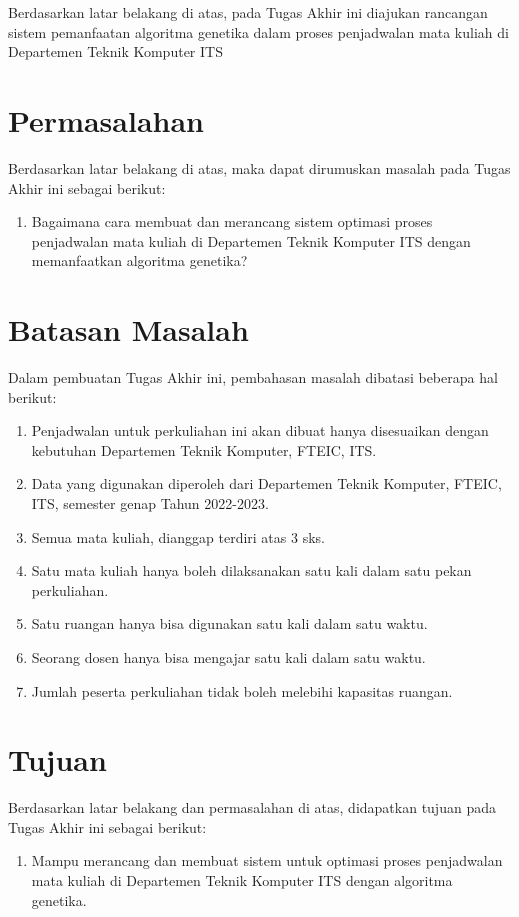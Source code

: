 Berdasarkan latar belakang di atas, pada Tugas Akhir ini diajukan rancangan sistem pemanfaatan algoritma genetika dalam proses penjadwalan mata kuliah di Departemen Teknik Komputer ITS
\section{Permasalahan}
\label{sec:permasalahan}

Berdasarkan latar belakang di atas, maka dapat dirumuskan masalah pada Tugas Akhir ini sebagai berikut:
\begin{enumerate}
    \item Bagaimana cara membuat dan merancang sistem optimasi proses penjadwalan mata kuliah di Departemen Teknik Komputer ITS dengan memanfaatkan algoritma genetika?
\end{enumerate}
\section{Batasan Masalah}
\label{sec:batasanmasalah}

Dalam pembuatan Tugas Akhir ini, pembahasan masalah dibatasi beberapa hal berikut:
\begin{enumerate}
    \item Penjadwalan untuk perkuliahan ini akan dibuat hanya disesuaikan dengan kebutuhan Departemen Teknik Komputer, FTEIC, ITS.
    \item Data yang digunakan diperoleh dari Departemen Teknik Komputer, FTEIC, ITS, semester genap Tahun 2022-2023.
    \item Semua mata kuliah, dianggap terdiri atas 3 sks.
    \item Satu mata kuliah hanya boleh dilaksanakan satu kali dalam satu pekan perkuliahan.
    \item Satu ruangan hanya bisa digunakan satu kali dalam satu waktu.
    \item Seorang dosen hanya bisa mengajar satu kali dalam satu waktu.
    \item Jumlah peserta perkuliahan tidak boleh melebihi kapasitas ruangan.
\end{enumerate}

\section{Tujuan}
\label{sec:Tujuan}

Berdasarkan latar belakang dan permasalahan di atas, didapatkan tujuan pada Tugas Akhir ini sebagai berikut:
\begin{enumerate}
    \item Mampu merancang dan membuat sistem untuk optimasi proses penjadwalan mata kuliah di Departemen Teknik Komputer ITS dengan algoritma genetika.
\end{enumerate}

